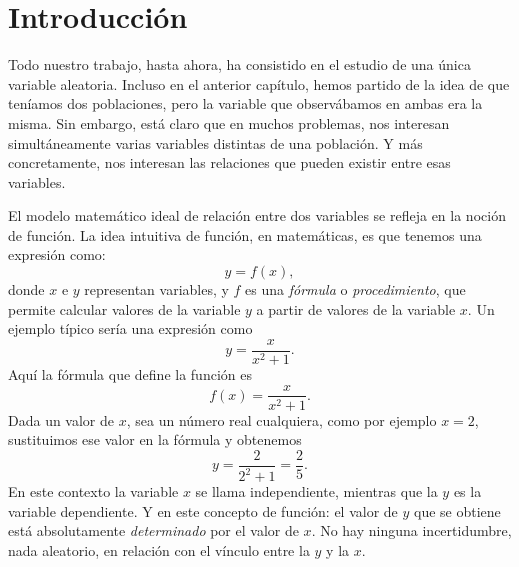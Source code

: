 
\section*{Introducción}\label{part04:intro}
Todo nuestro trabajo, hasta ahora, ha consistido en el estudio de una única variable aleatoria. Incluso en el anterior capítulo, hemos partido de la idea de que teníamos dos poblaciones, pero la variable que observábamos en ambas era la misma. Sin embargo, está claro que en muchos problemas, nos interesan simultáneamente varias variables distintas de una población. Y más concretamente, {\sf nos interesan las relaciones que pueden existir entre esas variables.}

El modelo matemático ideal de relación entre dos variables se refleja en la noción de {\sf función}. La idea intuitiva de función, en matemáticas, es que tenemos una expresión como:
\[y=f(x),\]
donde $x$ e $y$ representan {\sf variables}, y $f$ es una {\em fórmula} o {\em procedimiento}, que permite calcular valores de la variable $y$ a partir de valores de la variable $x$. Un ejemplo típico sería una expresión como
\[y=\frac{x}{x^2+1}.\]
Aquí la fórmula que define la función es
\[f(x)=\frac{x}{x^2+1}.\]
Dada un valor de $x$, sea un número real cualquiera, como por ejemplo $x=2$, sustituimos ese valor en la fórmula y obtenemos
\[y=\frac{2}{2^2+1}=\frac{2}{5}.\]
En este contexto la variable $x$ se llama {\sf independiente}, mientras que la $y$ es la {\sf variable dependiente}. Y en este concepto de función: el valor de $y$ que se obtiene está absolutamente {\em determinado} por el valor de $x$. No hay ninguna incertidumbre, nada aleatorio, en relación con el vínculo entre la $y$ y la $x$.

